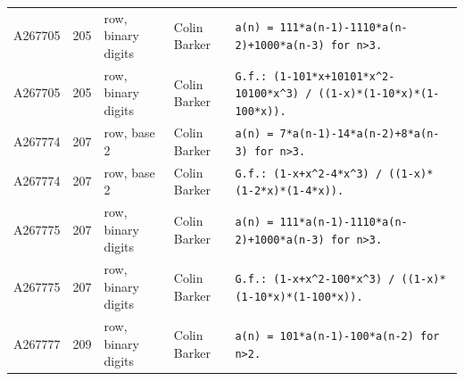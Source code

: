 \documentclass[11pt]{article}
\theoremstyle{definition}
\theoremstyle{remark}
\begin{document}
{\begin{longtable}{p{1.3cm}p{0.7cm}p{2.4cm}p{2.3cm}p{7.3cm}}
A267705 & 205 & row, binary digits & Colin Barker & \texttt{a(n)\allowbreak{} \allowbreak{}=\allowbreak{} \allowbreak{}111*\allowbreak{}a(n-\allowbreak{}1)\allowbreak{}-\allowbreak{}1110*\allowbreak{}a(n-\allowbreak{}2)\allowbreak{}+\allowbreak{}1000*\allowbreak{}a(n-\allowbreak{}3)\allowbreak{} \allowbreak{}for \allowbreak{}n>3.} \\
A267705 & 205 & row, binary digits & Colin Barker & \texttt{G.f.: \allowbreak{}(1-\allowbreak{}101*\allowbreak{}x+\allowbreak{}10101*\allowbreak{}x\^{}2-\allowbreak{}10100*\allowbreak{}x\^{}3)\allowbreak{} \allowbreak{}/\allowbreak{} \allowbreak{}((1-\allowbreak{}x)\allowbreak{}*\allowbreak{}(1-\allowbreak{}10*\allowbreak{}x)\allowbreak{}*\allowbreak{}(1-\allowbreak{}100*\allowbreak{}x)\allowbreak{})\allowbreak{}.} \\
A267774 & 207 & row, base 2 & Colin Barker & \texttt{a(n)\allowbreak{} \allowbreak{}=\allowbreak{} \allowbreak{}7*\allowbreak{}a(n-\allowbreak{}1)\allowbreak{}-\allowbreak{}14*\allowbreak{}a(n-\allowbreak{}2)\allowbreak{}+\allowbreak{}8*\allowbreak{}a(n-\allowbreak{}3)\allowbreak{} \allowbreak{}for \allowbreak{}n>3.} \\
A267774 & 207 & row, base 2 & Colin Barker & \texttt{G.f.: \allowbreak{}(1-\allowbreak{}x+\allowbreak{}x\^{}2-\allowbreak{}4*\allowbreak{}x\^{}3)\allowbreak{} \allowbreak{}/\allowbreak{} \allowbreak{}((1-\allowbreak{}x)\allowbreak{}*\allowbreak{}(1-\allowbreak{}2*\allowbreak{}x)\allowbreak{}*\allowbreak{}(1-\allowbreak{}4*\allowbreak{}x)\allowbreak{})\allowbreak{}.} \\
A267775 & 207 & row, binary digits & Colin Barker & \texttt{a(n)\allowbreak{} \allowbreak{}=\allowbreak{} \allowbreak{}111*\allowbreak{}a(n-\allowbreak{}1)\allowbreak{}-\allowbreak{}1110*\allowbreak{}a(n-\allowbreak{}2)\allowbreak{}+\allowbreak{}1000*\allowbreak{}a(n-\allowbreak{}3)\allowbreak{} \allowbreak{}for \allowbreak{}n>3.} \\
A267775 & 207 & row, binary digits & Colin Barker & \texttt{G.f.: \allowbreak{}(1-\allowbreak{}x+\allowbreak{}x\^{}2-\allowbreak{}100*\allowbreak{}x\^{}3)\allowbreak{} \allowbreak{}/\allowbreak{} \allowbreak{}((1-\allowbreak{}x)\allowbreak{}*\allowbreak{}(1-\allowbreak{}10*\allowbreak{}x)\allowbreak{}*\allowbreak{}(1-\allowbreak{}100*\allowbreak{}x)\allowbreak{})\allowbreak{}.} \\
A267777 & 209 & row, binary digits & Colin Barker & \texttt{a(n)\allowbreak{} \allowbreak{}=\allowbreak{} \allowbreak{}101*\allowbreak{}a(n-\allowbreak{}1)\allowbreak{}-\allowbreak{}100*\allowbreak{}a(n-\allowbreak{}2)\allowbreak{} \allowbreak{}for \allowbreak{}n>2.} \\

\end{longtable}}
\end{document}
